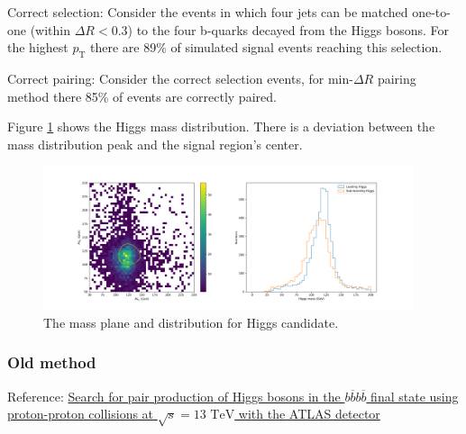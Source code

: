 \documentclass[12pt]{article}
\begin{document}
		Correct selection:
		Consider the events in which four jets can be matched one-to-one (within $\Delta R < 0.3$) to the four b-quarks decayed from the Higgs bosons. For the highest $p_\text{T} $ there are 89\% of simulated signal events reaching this selection.	

		Correct pairing: Consider the correct selection events, for $\text{min-}\Delta R$ pairing method there 85\% of events are correctly paired.

		Figure \ref{fig:Higgs_mass_new} shows the Higgs mass distribution. There is a deviation between the mass distribution peak and the signal region's center.  
		\begin{figure}[htpb]
			\centering
			\includegraphics[width=0.97\textwidth]{Higgs_mass_new_s.png}
			\caption{The mass plane and distribution for Higgs candidate.}
			\label{fig:Higgs_mass_new}
		\end{figure}

		\subsubsection{Old method}%
		\label{subs:subsubsection_name}
			Reference: \href{https://arxiv.org/pdf/1804.06174.pdf}{Search for pair production of Higgs bosons in the $b\overline{b}b\overline{b}$ final state using proton-proton collisions at $\sqrt{s} = \text{13 TeV}$ with the ATLAS detector}
\end{document}
